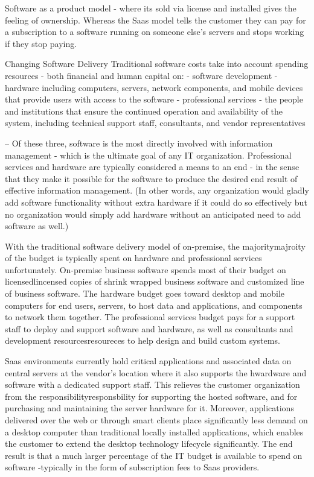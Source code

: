 \documentclass{article}
\begin{document}
Software as a product model - where its sold via license and installed gives the feeling of ownership. Whereas the Saas model tells the customer they can pay for a subscription to a software running on someone else's servers and stops working if they stop paying. 

Changing Software Delivery
Traditional software costs take into account spending resources -  both financial and human capital on:
- software development
- hardware including computers, servers, network components, and mobile devices that provide users with access to the software
- professional services - the people and institutions that ensure the continued operation and availability of the system, including technical support staff, consultants, and vendor representatives 

-- Of these three, software is the most directly involved with information management - which is the ultimate goal of any IT organization. Professional services and hardware are typically considered a means to an end - in the sense that they make it possible for the software to produce the desired end result of effective information management. (In other words, any organization would gladly add software functionality without extra hardware if it could do so effectively but no organization would simply add hardware without an anticipated need to add software as well.)

With the traditional software delivery model of on-premise, the majoritymajroity of the budget is typically spent on hardware and professional services unfortunately.
On-premise business software spends most of their budget on licensedlincensed copies of shrink wrapped business software and customized line of business software.  The hardware budget goes toward desktop and mobile computers for end users, servers, to host data and applications, and components to network them together. 
The professional services budget pays for a support staff to deploy and support software and hardware, as well as consultants and development resourcesresoureces to help design and build custom systems.

Saas environments currently hold critical applications and associated data on central servers at the vendor's location where it also supports the hwardware and software with a dedicated support staff. This relieves the customer organization from the responsibilityresponsbility for supporting the hosted software, and for purchasing and maintaining the server hardware for it. Moreover, applications delivered over the web or through smart clients place significantly less demand on a desktop computer than traditional locally installed applications, which enables the customer to extend the desktop technology lifecycle significantly. The end result is that a much larger percentage of the IT budget is available to spend on software -typically in the form of subscription fees to Saas providers.
\end{document}
